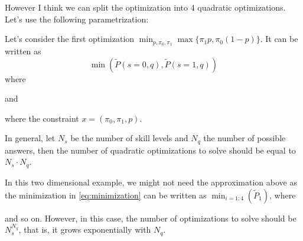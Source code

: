 \documentclass[runningheads]{llncs}
\begin{document}
	However I think we can split the optimization into 4 quadratic optimizations.
	Let's use the following parametrization:
	
	Let's consider the first optimization $\min_{p,\pi_0,\pi_1}  \max\{\pi_1 p, \pi_0 (1-p)\}$. It 
	can be written as
	$$ \min(\tilde{P}(s=0,q),\tilde{P}(s=1,q)) $$ 
	where 

	and 
	
	where the constraint $x = (\pi_0, \pi_1 ,p)$.
	
	
	In general, let $N_s$ be the number of skill levels and $N_q$ the number of possible 
	answers, then the number of quadratic optimizations to solve should be equal to 
	$N_s\cdot N_q$. 
	
	In this two dimensional example, we might not need the approximation above as the 
	minimization in \ref{eq:minimization} can be written as $\min_{i=1:4}(\tilde{P}_1)$, where
	
	and so on. However, in this case, the number of optimizations to solve should be 
	$N_s^{N_q}$, that is, it grows exponentially with  $N_q$. 
	
\end{document}
